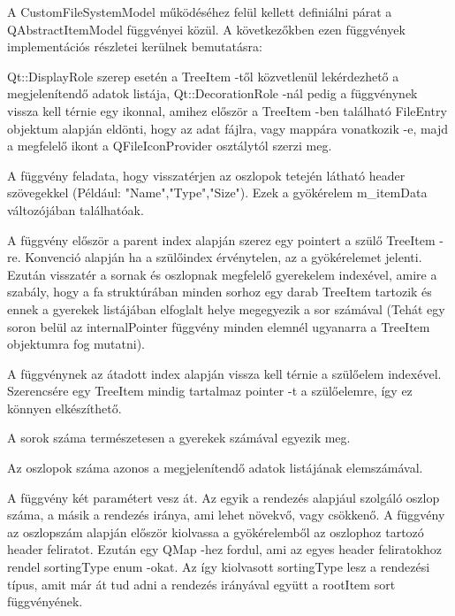 \begin{sloppypar}
A {\ttfamily CustomFileSystemModel} működéséhez felül kellett 
definiálni párat a {\ttfamily QAbstractItemModel} függvényei közül. 
A következőkben ezen függvények implementációs részletei kerülnek bemutatásra:

\begin{description}[font=\normalfont\itshape\bfseries\space]
\item [data:]
{\ttfamily Qt::DisplayRole} szerep esetén a {\ttfamily TreeItem} -től 
közvetlenül lekérdezhető a megjelenítendő adatok listája,
{\ttfamily Qt::DecorationRole} -nál pedig
a függvénynek vissza kell térnie egy ikonnal, 
amihez először a 
{\ttfamily TreeItem} -ben található {\ttfamily FileEntry} objektum alapján eldönti, 
hogy az adat fájlra, vagy mappára vonatkozik -e, 
majd a megfelelő ikont a {\ttfamily QFileIconProvider} osztálytól szerzi meg. 
\item [headerData:]
A függvény feladata, hogy visszatérjen 
az oszlopok tetején látható 
header szövegekkel (Például: "Name","Type","Size"). 
Ezek a gyökérelem
{\ttfamily m\_itemData} változójában találhatóak.
\item [index:]
A függvény először a parent index alapján szerez egy pointert 
a szülő {\ttfamily TreeItem} -re. 
Konvenció alapján ha a szülőindex érvénytelen, 
az a gyökérelemet jelenti. 
Ezután visszatér a sornak és oszlopnak megfelelő gyerekelem indexével, 
amire a szabály, 
hogy a fa struktúrában minden sorhoz egy darab {\ttfamily TreeItem} tartozik 
és ennek a gyerekek listájában elfoglalt helye megegyezik 
a sor számával (Tehát egy soron belül 
az {\ttfamily internalPointer} függvény minden elemnél ugyanarra 
a {\ttfamily TreeItem} objektumra fog mutatni).
\item [parent:]
A függvénynek az átadott index alapján
vissza kell térnie a szülőelem indexével. 
Szerencsére egy {\ttfamily TreeItem} mindig tartalmaz pointer -t a szülőelemre, 
így ez könnyen elkészíthető.
\item [rowCount:]
A sorok száma természetesen a gyerekek számával egyezik meg. 
\item [columnCount:]
Az oszlopok száma azonos a megjelenítendő adatok listájának elemszámával.
\item [sort:]
A függvény két paramétert vesz át. 
Az egyik a rendezés alapjául szolgáló oszlop száma, 
a másik a rendezés iránya,
ami lehet növekvő, vagy csökkenő. 
A függvény az oszlopszám alapján először kiolvassa a gyökérelemből 
az oszlophoz tartozó header feliratot. 
Ezután egy {\ttfamily QMap} -hez fordul, 
ami az egyes header feliratokhoz rendel {\ttfamily sortingType} enum -okat. 
Az így kiolvasott {\ttfamily sortingType} lesz a rendezési típus, 
amit már át tud adni a rendezés irányával együtt 
a {\ttfamily rootItem} {\ttfamily sort} függvényének.
\end{description}
\end{sloppypar}

